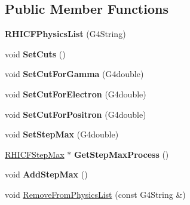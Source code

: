 \subsection*{Public Member Functions}
\begin{DoxyCompactItemize}
\item 
\hypertarget{class_r_h_i_c_f_physics_list_a5e4bf3ac92e1ea73dbcdbf0c74a60487}{}{\bfseries R\+H\+I\+C\+F\+Physics\+List} (G4\+String)\label{class_r_h_i_c_f_physics_list_a5e4bf3ac92e1ea73dbcdbf0c74a60487}

\item 
\hypertarget{class_r_h_i_c_f_physics_list_ae98a93d472ac75f6d984dde9d91b7575}{}void {\bfseries Set\+Cuts} ()\label{class_r_h_i_c_f_physics_list_ae98a93d472ac75f6d984dde9d91b7575}

\item 
\hypertarget{class_r_h_i_c_f_physics_list_a2e64cb1fbb790eb0efd3b6f1a5dad787}{}void {\bfseries Set\+Cut\+For\+Gamma} (G4double)\label{class_r_h_i_c_f_physics_list_a2e64cb1fbb790eb0efd3b6f1a5dad787}

\item 
\hypertarget{class_r_h_i_c_f_physics_list_a1959042d3c6d12e6251209f25ffd3118}{}void {\bfseries Set\+Cut\+For\+Electron} (G4double)\label{class_r_h_i_c_f_physics_list_a1959042d3c6d12e6251209f25ffd3118}

\item 
\hypertarget{class_r_h_i_c_f_physics_list_ade29c53c57444dd9085b0055f1848f3e}{}void {\bfseries Set\+Cut\+For\+Positron} (G4double)\label{class_r_h_i_c_f_physics_list_ade29c53c57444dd9085b0055f1848f3e}

\item 
\hypertarget{class_r_h_i_c_f_physics_list_af39cf17eace11546d98872f25e4ce120}{}void {\bfseries Set\+Step\+Max} (G4double)\label{class_r_h_i_c_f_physics_list_af39cf17eace11546d98872f25e4ce120}

\item 
\hypertarget{class_r_h_i_c_f_physics_list_a18f4a0f48e0d35fc2eda861ca8d2380e}{}\hyperlink{class_r_h_i_c_f_step_max}{R\+H\+I\+C\+F\+Step\+Max} $\ast$ {\bfseries Get\+Step\+Max\+Process} ()\label{class_r_h_i_c_f_physics_list_a18f4a0f48e0d35fc2eda861ca8d2380e}

\item 
\hypertarget{class_r_h_i_c_f_physics_list_aba078afb485583c65dd3fb6adb154b84}{}void {\bfseries Add\+Step\+Max} ()\label{class_r_h_i_c_f_physics_list_aba078afb485583c65dd3fb6adb154b84}

\item 
\hypertarget{class_r_h_i_c_f_physics_list_a51ce859d9bc4ea6d9e6a968ccf19c0cc}{}void \hyperlink{class_r_h_i_c_f_physics_list_a51ce859d9bc4ea6d9e6a968ccf19c0cc}{Remove\+From\+Physics\+List} (const G4\+String \&)\label{class_r_h_i_c_f_physics_list_a51ce859d9bc4ea6d9e6a968ccf19c0cc}


\end{DoxyCompactItemize}
